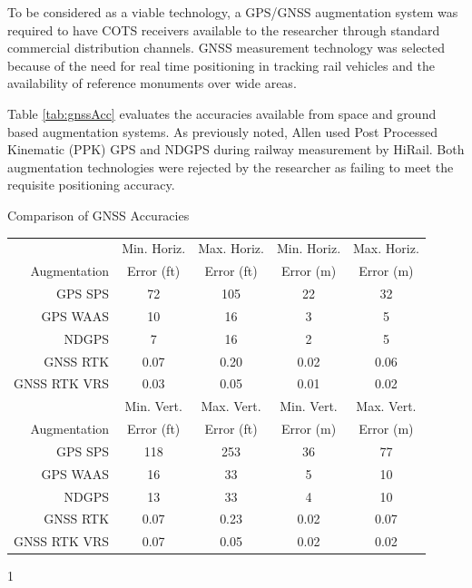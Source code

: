 To be considered as a viable technology, a GPS/GNSS augmentation system was required to have COTS receivers available to the researcher through standard commercial distribution channels. GNSS measurement technology was selected because of the need for real time positioning in tracking rail vehicles and the availability of reference monuments over wide areas. 

Table \ref{tab:gnssAcc} evaluates the accuracies available from space and ground based augmentation systems. As previously noted, Allen used Post Processed Kinematic (PPK) GPS and NDGPS during railway measurement by HiRail. Both augmentation technologies were rejected by the researcher as failing to meet the requisite positioning accuracy.

\begin{center}
\begin{threeparttable}[ht]
	\caption{Comparison of GNSS Accuracies}\label{tab:gnssAcc}
	\begin{tabular}{ r c c | c c}
	\toprule
	&{Min. Horiz.} &{Max. Horiz.} &{Min. Horiz. } &{Max. Horiz. }\\
	{Augmentation}&{Error (ft)} &{Error (ft)} &{Error (m)} &{Error (m)}\\
	\midrule	
GPS SPS\tnote{1}            &	72 & 105 & 22 & 32 \\%
GPS WAAS\tnote{2}         &	10 & 16 & 3 & 5 \\%
NDGPS\tnote{3}               &	7 & 16 & 2 & 5\\%
GNSS RTK\tnote{4,~6}	& 0.07 & 0.20 & 0.02 & 0.06 \\%
GNSS RTK VRS\tnote{5,~7}    & 0.03 & 0.05 & 0.01& 0.02 \\%
	\midrule
	&{Min. Vert.} &{Max. Vert.} &{Min. Vert.} &{Max. Vert.}\\
	{Augmentation}&{Error (ft)} &{Error (ft)} &{Error (m)} &{Error (m)}\\
	\midrule						
GPS SPS\tnote{1}  & 118 & 253 & 36 & 77\\%
GPS WAAS\tnote{2} & 16 & 33 & 5 & 10\\%
NDGPS & 13 & 33 & 4 & 10\\%
GNSS RTK\tnote{4,~6} & 0.07 & 0.23 & 0.02 & 0.07\\%
GNSS RTK VRS\tnote{5,~7} & 0.07 & 0.05 & 0.02 & 0.02\\%
	\bottomrule
	\end{tabular}
\begin{tablenotes}
	\item[1]~\citep{2001DoDGPSperf}

\end{tablenotes}
\end{threeparttable}
\end{center}
